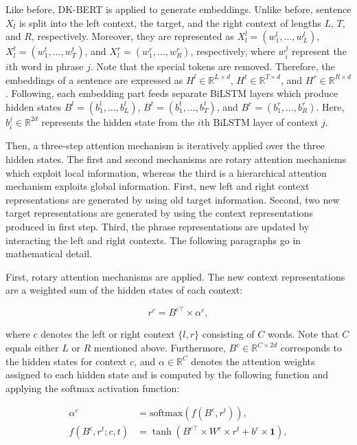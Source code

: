 \documentclass[american, oneside]{ecsgdp}
\begin{document}
Like before, DK-BERT is applied to generate embeddings. Unlike before, sentence $X_l$ is split into the left context, the target, and the right context of lengths $L$, $T$, and $R$, respectively. Moreover, they are represented as $X_l^l = \left ( w_1^l, \ldots, w_L^l \right )$, $X_l^t = \left ( w_1^t, \ldots, w_T^t \right )$, and $X_l^r = \left ( w_1^r, \ldots, w_R^r \right )$, respectively, where $w_i^j$ represent the $i$th word in phrase $j$. Note that the special tokens are removed. Therefore, the embeddings of a sentence are expressed as $H^l \in \mathbb{R}^{L \times d}$, $H^t \in \mathbb{R}^{T \times d}$, and $H^r \in \mathbb{R}^{R \times d}$. Following, each embedding part feeds separate BiLSTM layers which produce hidden states $B^l = \left( b_1^l, \dots, b_L^l \right)$, $B^t = \left( b_1^t, \dots, b_T^t \right)$, and $B^r = \left( b_1^r, \dots, b_R^r \right)$. Here, $b_i^j \in \mathbb{R}^{2d}$ represents the hidden state from the $i$th BiLSTM layer of context $j$.

Then, a three-step attention mechanism is iteratively applied over the three hidden states. The first and second mechanisms are rotary attention mechanisms which exploit local information, whereas the third is a hierarchical attention mechanism exploits global information. First, new left and right context representations are generated by using old target information. Second, two new target representations are generated by using the context representations produced in first step. Third, the phrase representations are updated by interacting the left and right contexts. The following paragraphs go in mathematical detail.

First, rotary attention mechanisms are applied. The new context representations are a weighted sum of the hidden states of each context: 

\begin{equation}
    r^c = B^{c\top} \times \alpha^c, \label{eq:rot_att}
\end{equation}

\noindent where $c$ denotes the left or right context $\{l, r\}$ consisting of $C$ words. Note that $C$ equals either $L$ or $R$ mentioned above. Furthermore, $B^c \in \mathbb{R}^{C \times 2d}$ corresponds to the hidden states for context $c$, and $\alpha \in \mathbb{R}^{C}$ denotes the attention weights assigned to each hidden state and is computed by the following function and applying the softmax activation function:

\begin{align}
    \alpha^c                         & = \text{softmax}\left( f \left( B^c, r^t\right) \right), \label{eq:alpha}\\
    f \left( B^c, r^t; c, t \right) & = \tanh{\left( B^{c\top} \times W^c \times r^t + b^c \times \mathbf{1} \right)}, \label{eq:tanh}
\end{align}
\end{document}
